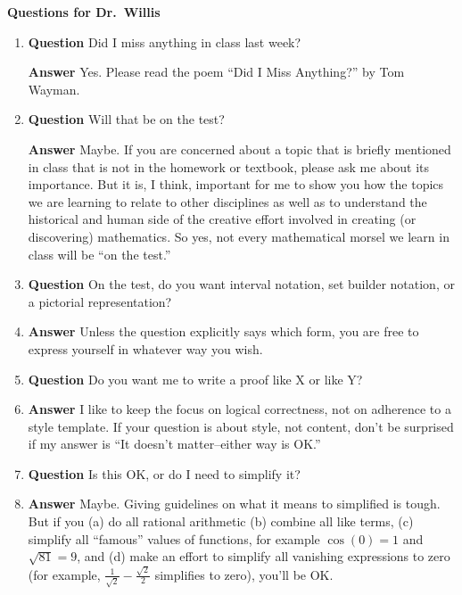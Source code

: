 \documentclass[11pt]{article}
\newcounter{ex}\setcounter{ex}{0}
\begin{document}
\begin{flushleft}
  \large
\textbf{ Questions for Dr.\ Willis}
\end{flushleft}  
\normalsize
\begin{enumerate}

\item \textbf{Question} Did I miss anything in class last week?

\textbf{Answer} Yes.  Please read  the poem “Did I Miss Anything?” by Tom Wayman.  

\item \textbf{Question} Will that be on the test?

\textbf{Answer} Maybe. If you are concerned about a topic that is briefly
mentioned in class that is not in the homework or textbook, please ask me
about its importance. But it is, I think, important for me to 
show you how the topics we are learning to relate to other disciplines  
as well as to understand the historical and human side of the
creative effort involved in creating (or discovering) mathematics. So yes,
not every mathematical morsel we learn in class will be ``on the test.''

\item \textbf{Question} On the test, do you want interval notation, set builder
notation, or a pictorial representation?

\item  \textbf{Answer} Unless the question explicitly says which form,
you are free to express yourself in whatever way you wish.

\item \textbf{Question} Do you want me to write a proof like X or 
like Y?

\item  \textbf{Answer} I like to keep the focus on logical 
correctness, not on adherence to a style template. If your question is about
style, not content, don't be surprised if my answer is ``It doesn't 
matter--either way is OK.'' 

\item \textbf{Question} Is this OK, or do I need to simplify it?

\item  \textbf{Answer} Maybe. Giving guidelines on what it means to 
  simplified is tough. But if you  (a) do all rational arithmetic (b) combine
  all like terms, (c) simplify all ``famous'' values of functions, 
  for example $\cos(0)=1$ and $\sqrt{81} = 9$, and (d) make an effort
  to simplify all vanishing expressions to zero (for example, 
  $\frac{1}{\sqrt{2}} - \frac{\sqrt{2}}{2}$ simplifies to zero), you'll be OK.


\end{enumerate}
\end{document}
